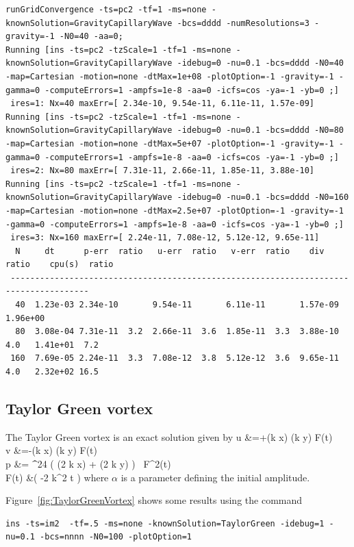 \begin{Verbatim}[fontsize=\small]
	runGridConvergence -ts=pc2 -tf=1 -ms=none -knownSolution=GravityCapillaryWave -bcs=dddd -numResolutions=3 -gravity=-1 -N0=40 -aa=0;
Running [ins -ts=pc2 -tzScale=1 -tf=1 -ms=none -knownSolution=GravityCapillaryWave -idebug=0 -nu=0.1 -bcs=dddd -N0=40 -map=Cartesian -motion=none -dtMax=1e+08 -plotOption=-1 -gravity=-1 -gamma=0 -computeErrors=1 -ampfs=1e-8 -aa=0 -icfs=cos -ya=-1 -yb=0 ;]
 ires=1: Nx=40 maxErr=[ 2.34e-10, 9.54e-11, 6.11e-11, 1.57e-09]
Running [ins -ts=pc2 -tzScale=1 -tf=1 -ms=none -knownSolution=GravityCapillaryWave -idebug=0 -nu=0.1 -bcs=dddd -N0=80 -map=Cartesian -motion=none -dtMax=5e+07 -plotOption=-1 -gravity=-1 -gamma=0 -computeErrors=1 -ampfs=1e-8 -aa=0 -icfs=cos -ya=-1 -yb=0 ;]
 ires=2: Nx=80 maxErr=[ 7.31e-11, 2.66e-11, 1.85e-11, 3.88e-10]
Running [ins -ts=pc2 -tzScale=1 -tf=1 -ms=none -knownSolution=GravityCapillaryWave -idebug=0 -nu=0.1 -bcs=dddd -N0=160 -map=Cartesian -motion=none -dtMax=2.5e+07 -plotOption=-1 -gravity=-1 -gamma=0 -computeErrors=1 -ampfs=1e-8 -aa=0 -icfs=cos -ya=-1 -yb=0 ;]
 ires=3: Nx=160 maxErr=[ 2.24e-11, 7.08e-12, 5.12e-12, 9.65e-11]
  N     dt      p-err  ratio   u-err  ratio   v-err  ratio    div   ratio    cpu(s)  ratio
 --------------------------------------------------------------------------------------
  40  1.23e-03 2.34e-10       9.54e-11       6.11e-11       1.57e-09        1.96e+00
  80  3.08e-04 7.31e-11  3.2  2.66e-11  3.6  1.85e-11  3.3  3.88e-10  4.0   1.41e+01  7.2
 160  7.69e-05 2.24e-11  3.3  7.08e-12  3.8  5.12e-12  3.6  9.65e-11  4.0   2.32e+02 16.5
\end{Verbatim}


\clearpage
\subsection{Taylor Green vortex} \label{sec:taylor_green_vortex}

The Taylor Green vortex is an exact solution given by
\bse
\ba
  u &=+\alpha \sin(k x) \cos(k y) F(t) \\
  v &=-\alpha \cos(k x) \sin(k y) F(t) \\
  p &= \f{\rho\alpha^2}{4} ( \cos(2 k x) + \cos(2 k y) ) \, F^2(t) \\
  F(t) &\eqdef \exp( -2 \nu k^2 t )
\ea
\ese
where $\alpha$ is a parameter defining the initial amplitude.

\mni
Figure~\ref{fig:TaylorGreenVortex} shows some results using the command
\begin{Verbatim}[fontsize=\small]
ins -ts=im2  -tf=.5 -ms=none -knownSolution=TaylorGreen -idebug=1 -nu=0.1 -bcs=nnnn -N0=100 -plotOption=1
\end{Verbatim}

